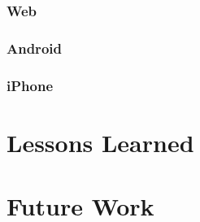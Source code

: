 \documentclass{dependencies/acm_proc_article-sp}
\begin{document}
\subsubsection{Web}

\subsubsection{Android}

\subsubsection{iPhone}

\section{Lessons Learned}

\section{Future Work}

\newpage
%

%
%
\balancecolumns
\end{document}
